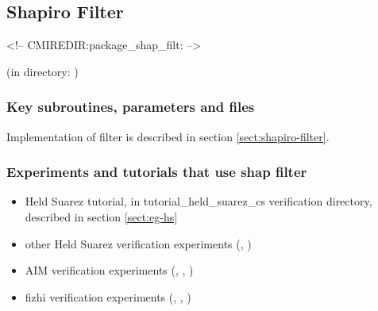 \subsection{Shapiro Filter}
\label{sec:shap_filt}
\begin{rawhtml}
<!-- CMIREDIR:package_shap_filt: -->
\end{rawhtml}
\begin{center}
(in directory: )
\end{center}

\subsubsection{Key subroutines, parameters and files}
Implementation of \cite{Shapiro_70} filter is described in
section \ref{sect:shapiro-filter}.



\subsubsection{Experiments and tutorials that use shap filter}
\label{sec:pkg:shap_filt:experiments}

\begin{itemize}
\item Held Suarez tutorial, in tutorial\_held\_suarez\_cs verification directory, described in 
section \ref{sect:eg-hs}
\item other Held Suarez verification experiments (, 
      )
\item AIM verification experiments (, 
       , )
\item fizhi verification experiments (, 
       , )

\end{itemize}

